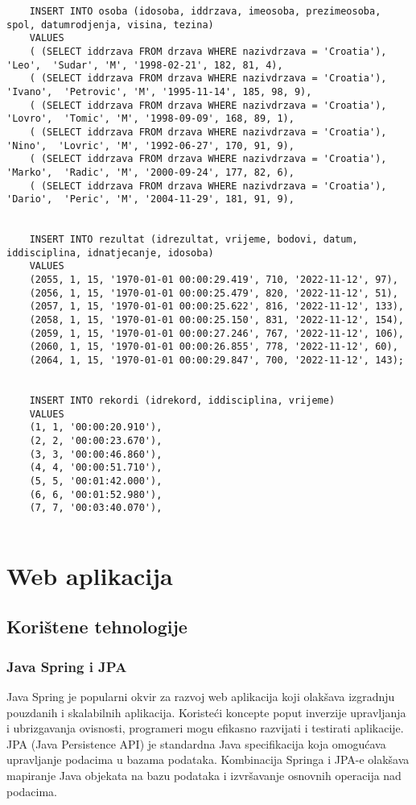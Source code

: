 \documentclass[times, utf8, zavrsni]{fer}
\begin{document}
\begin{lstlisting}
    INSERT INTO osoba (idosoba, iddrzava, imeosoba, prezimeosoba, spol, datumrodjenja, visina, tezina)
    VALUES 
    ( (SELECT iddrzava FROM drzava WHERE nazivdrzava = 'Croatia'), 'Leo',  'Sudar', 'M', '1998-02-21', 182, 81, 4),
    ( (SELECT iddrzava FROM drzava WHERE nazivdrzava = 'Croatia'), 'Ivano',  'Petrovic', 'M', '1995-11-14', 185, 98, 9),
    ( (SELECT iddrzava FROM drzava WHERE nazivdrzava = 'Croatia'), 'Lovro',  'Tomic', 'M', '1998-09-09', 168, 89, 1),
    ( (SELECT iddrzava FROM drzava WHERE nazivdrzava = 'Croatia'), 'Nino',  'Lovric', 'M', '1992-06-27', 170, 91, 9),
    ( (SELECT iddrzava FROM drzava WHERE nazivdrzava = 'Croatia'), 'Marko',  'Radic', 'M', '2000-09-24', 177, 82, 6),
    ( (SELECT iddrzava FROM drzava WHERE nazivdrzava = 'Croatia'), 'Dario',  'Peric', 'M', '2004-11-29', 181, 91, 9),


    INSERT INTO rezultat (idrezultat, vrijeme, bodovi, datum, iddisciplina, idnatjecanje, idosoba)
    VALUES 
    (2055, 1, 15, '1970-01-01 00:00:29.419', 710, '2022-11-12', 97),
    (2056, 1, 15, '1970-01-01 00:00:25.479', 820, '2022-11-12', 51),
    (2057, 1, 15, '1970-01-01 00:00:25.622', 816, '2022-11-12', 133),
    (2058, 1, 15, '1970-01-01 00:00:25.150', 831, '2022-11-12', 154),
    (2059, 1, 15, '1970-01-01 00:00:27.246', 767, '2022-11-12', 106),
    (2060, 1, 15, '1970-01-01 00:00:26.855', 778, '2022-11-12', 60),
    (2064, 1, 15, '1970-01-01 00:00:29.847', 700, '2022-11-12', 143);


    INSERT INTO rekordi (idrekord, iddisciplina, vrijeme)
    VALUES
    (1, 1, '00:00:20.910'),
    (2, 2, '00:00:23.670'),
    (3, 3, '00:00:46.860'),
    (4, 4, '00:00:51.710'),
    (5, 5, '00:01:42.000'),  
    (6, 6, '00:01:52.980'),
    (7, 7, '00:03:40.070'),


\end{lstlisting}

\chapter{Web aplikacija}

\section{Korištene tehnologije}

\subsection{Java Spring i JPA}
Java Spring je popularni okvir za razvoj web aplikacija koji olakšava izgradnju pouzdanih i skalabilnih aplikacija. 
Koristeći koncepte poput inverzije upravljanja i ubrizgavanja ovisnosti, programeri mogu efikasno razvijati i testirati aplikacije. 
JPA (Java Persistence API) je standardna Java specifikacija koja omogućava upravljanje podacima u bazama podataka. 
Kombinacija Springa i JPA-e olakšava mapiranje Java objekata na bazu podataka i izvršavanje osnovnih operacija nad podacima.
\end{document}
